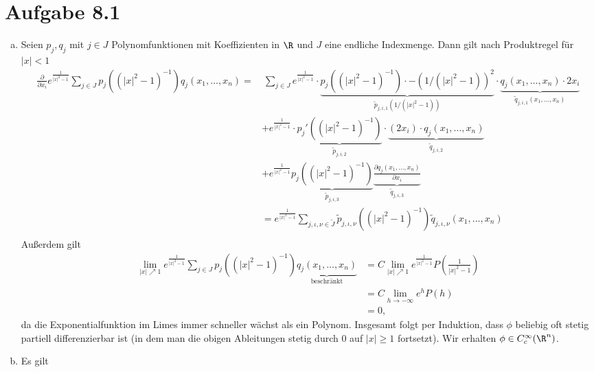 \documentclass{article}
\begin{document}
\def\headheight{25pt}
    \section*{Aufgabe 8.1}
    \begin{enumerate}[(a)]
        \item Seien $p_j, q_j$ mit $j\in J$ Polynomfunktionen mit Koeffizienten in $\R$ und $J$ eine endliche Indexmenge. 
        Dann gilt nach Produktregel für $|x| < 1$
        \begin{align*}
            \frac{\partial}{\partial x_i} e^{\frac{1}{|x|^2 - 1}} \sum_{j\in J}  p_j\left((|x|^2 -1)^{-1}\right) q_j(x_1, \dots, x_n) 
            =&\ \sum_{j\in J} e^{\frac{1}{|x|^2 - 1}} \cdot \underbrace{p_j((|x|^2 -1)^{-1}) \cdot -(1/(|x|^2 -1))^2}_{\tilde p_{j,i,1}(1/(|x|^2-1))} \cdot \underbrace{q_j(x_1, \dots, x_n)  \cdot 2x_i}_{\tilde q_{j,i,1}(x_1,\dots, x_n)}\\
            &+ e^{\frac{1}{|x|^2 - 1}} \cdot \underbrace{p_j'((|x|^2 -1)^{-1})}_{\tilde p_{j,i,2}} \cdot \underbrace{(2 x_i) \cdot q_j(x_1, \dots, x_n)}_{\tilde q_{j,i,2}}\\
            &+ e^{\frac{1}{|x|^2 - 1}} \underbrace{p_j((|x|^2 -1)^{-1})}_{\tilde p_{j,i,3}} \underbrace{\frac{\partial q_j(x_1, \dots, x_n)}{\partial x_i}}_{\tilde q_{j,i,3}}\\
            &= e^{\frac{1}{|x|^2 - 1}} \sum_{j, \iota, \nu \in \tilde J} \tilde p_{j, \iota, \nu}((|x|^2-1)^{-1}) \tilde q_{j, \iota, \nu}(x_1, \dots, x_n)\\
        \end{align*}
        Außerdem gilt
        \begin{align*}
            \lim\limits_{|x| \nearrow 1} e^{\frac{1}{|x|^2 - 1}} \sum_{j\in J}  p_j\left((|x|^2 -1)^{-1}\right) \underbrace{q_j(x_1, \dots, x_n)}_{\text{beschränkt}} &= C \lim\limits_{|x| \nearrow 1} e^{\frac{1}{|x|^2 - 1}} P\left(\frac{1}{|x|^2-1}\right)\\
            &= C \lim\limits_{h \to -\infty} e^{h} P(h)\\
            &= 0,
            \end{align*}
        da die Exponentialfunktion im Limes immer schneller wächst als ein Polynom.
        Insgesamt folgt per Induktion, dass $\phi$ beliebig oft stetig partiell differenzierbar ist (in dem man die obigen Ableitungen stetig durch 0 auf $|x| \geq 1$ fortsetzt). Wir erhalten $\phi \in C^\infty_c(\R^n)$.
        \item Es gilt 

\end{enumerate}
\end{document}
